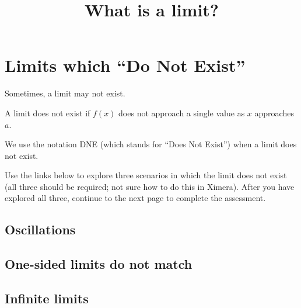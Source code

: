 \documentclass{ximera}
\title{What is a limit?}
\begin{document}
\begin{abstract}
\end{abstract}

\section{Limits which ``Do Not Exist''}

Sometimes, a limit may not exist.

\begin{explanation}
    A limit does not exist if $f(x)$ does not approach a single value as $x$ approaches $a$.
\end{explanation}

We use the notation DNE (which stands for ``Does Not Exist'') when a limit does not exist.

Use the links below to explore three scenarios in which the limit does not exist (all three should be required; not sure how to do this in Ximera). After you have explored all three, continue to the next page to complete the assessment.

\subsection{Oscillations}
\begin{center}
\end{center}
\subsection{One-sided limits do not match}
\begin{center}
\end{center}
\subsection{Infinite limits}
\begin{center}
\end{center}
\end{document}
